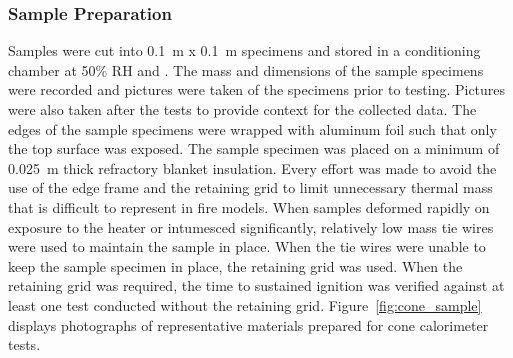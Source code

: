 \documentclass[12pt,oneside]{book}
\begin{document}
\subsubsection{Sample Preparation}

Samples were cut into 0.1~m x 0.1~m specimens and stored in a conditioning chamber at 50\% RH and . The mass and dimensions of the sample specimens were recorded and pictures were taken of the specimens prior to testing. Pictures were also taken after the tests to provide context for the collected data. The edges of the sample specimens were wrapped with aluminum foil such that only the top surface was exposed. The sample specimen was placed on a minimum of 0.025~m thick refractory blanket insulation. Every effort was made to avoid the use of the edge frame and the retaining grid to limit unnecessary thermal mass that is difficult to represent in fire models. When samples deformed rapidly on exposure to the heater or intumesced significantly, relatively low mass tie wires were used to maintain the sample in place. When the tie wires were unable to keep the sample specimen in place, the retaining grid was used. When the retaining grid was required, the time to sustained ignition was verified against at least one test conducted without the retaining grid. Figure~\ref{fig:cone_sample} displays photographs of representative materials prepared for cone calorimeter tests.
\end{document}
